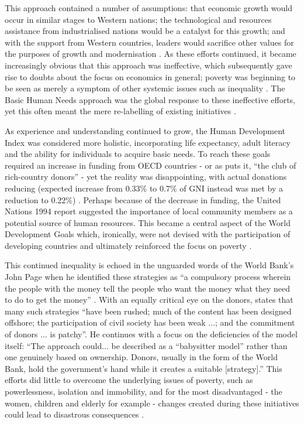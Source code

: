 This approach contained a number of assumptions: that economic growth would occur in similar stages to Western nations; the technological and resources assistance from industrialised nations would be a catalyst for this growth; and with the support from Western countries, leaders would sacrifice other values for the purposes of growth and modernisation \citep{Morrison2009}. As these efforts continued, it became increasingly obvious that this approach was ineffective, which subsequently gave rise to doubts about the focus on economics in general; poverty was beginning to be seen as merely a symptom of other systemic issues such as inequality \citep{Morrison2009}. The Basic Human Needs approach was the global response to these ineffective efforts, yet this often meant the mere re-labelling of existing initiatives \citep{Morrison2009}.

As experience and understanding continued to grow, the Human Development Index was considered more holistic, incorporating life expectancy, adult literacy and the ability for individuals to acquire basic needs. To reach these goals required an increase in funding from OECD countries - or as \citet[][p235]{Morrison2009} puts it, “the club of rich-country donors” - yet the reality was disappointing, with actual donations reducing (expected increase from 0.33\% to 0.7\% of GNI instead was met by a reduction to 0.22\%) \citep{Morrison2009}. Perhaps because of the decrease in funding, the United Nations 1994 report suggested the importance of local community members as a potential source of human resources. This became a central aspect of the World Development Goals which, ironically, were not devised with the participation of developing countries and ultimately reinforced the focus on poverty \citep{Morrison2009}. 

This continued inequality is echoed in the unguarded words of the World Bank's John Page when he identified these strategies as “a compulsory process wherein the people with the money tell the people who want the money what they need to do to get the money” \citep[][p147]{IMF2001}. With an equally critical eye on the donors, \citet[][p14]{Smillie2004} states that many such strategies “have been rushed; much of the content has been designed offshore; the participation of civil society has been weak ...; and the commitment of donors ... is patchy”. He continues with a focus on the deficiencies of the model itself: “The approach could... be described as a “babysitter model” rather than one genuinely based on ownership. Donors, usually in the form of the World Bank, hold the government’s hand while it creates a suitable [strategy].” This efforts did little to overcome the underlying issues of poverty, such as powerlessness, isolation and immobility, and for the most disadvantaged - the women, children and elderly for example - changes created during these initiatives could lead to disastrous consequences \citep{Morrison2009}. 

